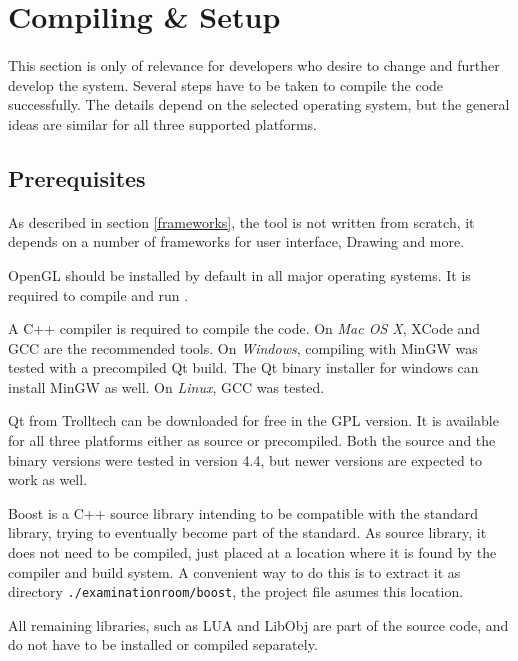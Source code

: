 \section{Compiling \& Setup\label{Setup}}
\paragraph{}
This section is only of relevance for developers who desire to change and further develop the system. Several steps have to be taken to compile the code successfully.
The details depend on the selected operating system, but the general ideas are similar for all three supported platforms.

\subsection{Prerequisites}
\paragraph{}
As described in section \ref{frameworks}, the tool is not written from scratch, it depends on a number of frameworks for user interface, Drawing and more.

OpenGL should be installed by default in all major operating systems. It is required to compile and run \ER.

A C++ compiler is required to compile the code.
On \textit{Mac OS X}, XCode and GCC are the recommended tools.
On \textit{Windows}, compiling with MinGW was tested with a precompiled Qt build.
The Qt binary installer for windows can install MinGW as well.
On \textit{Linux}, GCC was tested.

Qt from Trolltech can be downloaded for free in the GPL version\cite{qt}.
It is available for all three platforms either as source or precompiled.
Both the source and the binary versions were tested in version 4.4, but newer versions are expected to work as well.

Boost is a C++ source library intending to be compatible with the standard library, trying to eventually become part of the standard\cite{boost}.
As source library, it does not need to be compiled, just placed at a location where it is found by the compiler and build system.
A convenient way to do this is to extract it as directory \texttt{./examinationroom/boost}, the project file asumes this location.

All remaining libraries, such as LUA and LibObj are part of the source code, and do not have to be installed or compiled separately.


